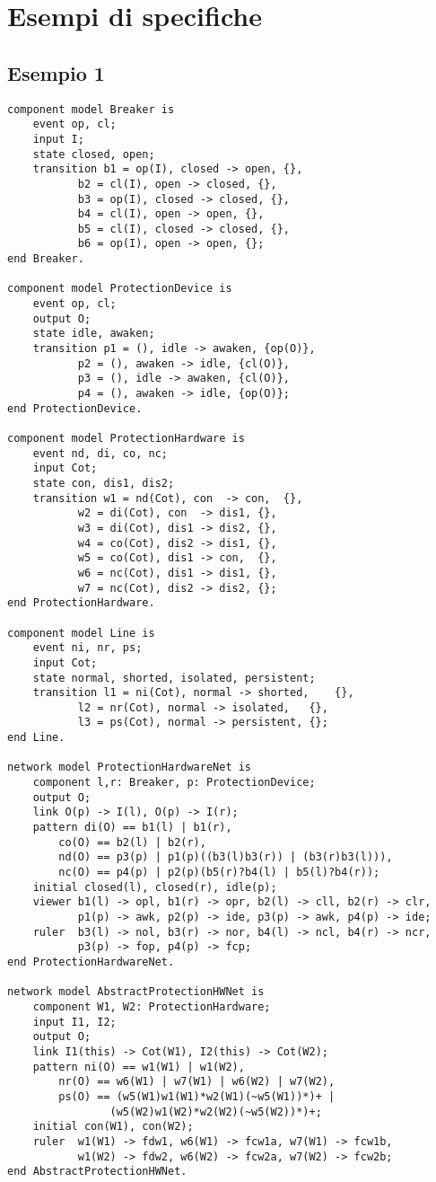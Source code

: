 \chapter{Esempi di specifiche}
\section{Esempio 1}
\begin{verbatim}
component model Breaker is
	event op, cl;
	input I;
	state closed, open;
	transition b1 = op(I), closed -> open, {},
		   b2 = cl(I), open -> closed, {},
	 	   b3 = op(I), closed -> closed, {},
		   b4 = cl(I), open -> open, {},
		   b5 = cl(I), closed -> closed, {},
		   b6 = op(I), open -> open, {};
end Breaker.

component model ProtectionDevice is
	event op, cl;
	output O;
	state idle, awaken;
	transition p1 = (), idle -> awaken, {op(O)},
		   p2 = (), awaken -> idle, {cl(O)},
		   p3 = (), idle -> awaken, {cl(O)},
		   p4 = (), awaken -> idle, {op(O)};
end ProtectionDevice.

component model ProtectionHardware is
	event nd, di, co, nc;
	input Cot;
	state con, dis1, dis2;
	transition w1 = nd(Cot), con  -> con,  {},
		   w2 = di(Cot), con  -> dis1, {},
		   w3 = di(Cot), dis1 -> dis2, {},
		   w4 = co(Cot), dis2 -> dis1, {},
		   w5 = co(Cot), dis1 -> con,  {},
		   w6 = nc(Cot), dis1 -> dis1, {},
		   w7 = nc(Cot), dis2 -> dis2, {};
end ProtectionHardware.

component model Line is
	event ni, nr, ps;
	input Cot;
	state normal, shorted, isolated, persistent;
	transition l1 = ni(Cot), normal -> shorted,    {},
		   l2 = nr(Cot), normal -> isolated,   {},
		   l3 = ps(Cot), normal -> persistent, {};
end Line.

network model ProtectionHardwareNet is
	component l,r: Breaker, p: ProtectionDevice;
	output O;
	link O(p) -> I(l), O(p) -> I(r);
	pattern di(O) == b1(l) | b1(r),
		co(O) == b2(l) | b2(r),
		nd(O) == p3(p) | p1(p)((b3(l)b3(r)) | (b3(r)b3(l))),
		nc(O) == p4(p) | p2(p)(b5(r)?b4(l) | b5(l)?b4(r));
	initial closed(l), closed(r), idle(p);
	viewer b1(l) -> opl, b1(r) -> opr, b2(l) -> cll, b2(r) -> clr,
	       p1(p) -> awk, p2(p) -> ide, p3(p) -> awk, p4(p) -> ide;
	ruler  b3(l) -> nol, b3(r) -> nor, b4(l) -> ncl, b4(r) -> ncr,
	       p3(p) -> fop, p4(p) -> fcp;
end ProtectionHardwareNet.

network model AbstractProtectionHWNet is
	component W1, W2: ProtectionHardware;
	input I1, I2;
	output O;
	link I1(this) -> Cot(W1), I2(this) -> Cot(W2);
	pattern	ni(O) == w1(W1) | w1(W2),
		nr(O) == w6(W1) | w7(W1) | w6(W2) | w7(W2),
		ps(O) == (w5(W1)w1(W1)*w2(W1)(~w5(W1))*)+ | 
				(w5(W2)w1(W2)*w2(W2)(~w5(W2))*)+;
	initial con(W1), con(W2);
	ruler  w1(W1) -> fdw1, w6(W1) -> fcw1a, w7(W1) -> fcw1b,
	       w1(W2) -> fdw2, w6(W2) -> fcw2a, w7(W2) -> fcw2b;
end AbstractProtectionHWNet.


\end{verbatim}
